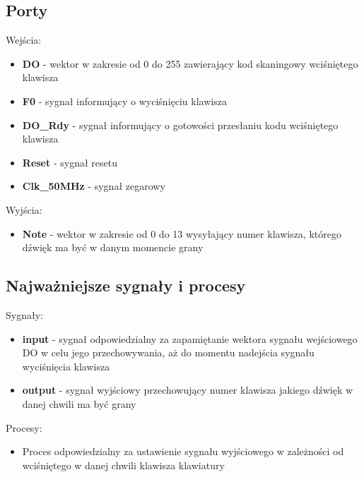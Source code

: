 \documentclass[a4paper]{report}
\begin{document}
		\subsection{Porty}
			{\Large Wejścia:}
			\begin{itemize}	 
				\item \textbf{DO} - wektor w zakresie od 0 do 255 zawierający kod skaningowy wciśniętego klawisza
				\item \textbf{F0} - sygnał informujący o wyciśnięciu klawisza
				\item \textbf{DO\_Rdy} - sygnał informujący o gotowości przesłaniu kodu wciśniętego klawisza
				\item \textbf{Reset} - sygnał resetu
				\item \textbf{Clk\_50MHz} - sygnał zegarowy
			\end{itemize}
			{\Large Wyjścia:}
			\begin{itemize} 
				\item \textbf{Note} - wektor w zakresie od 0 do 13 wysyłający numer klawisza, którego dźwięk ma być w danym momencie grany
			\end{itemize}
		\subsection{Najważniejsze sygnały i procesy}
			{\Large Sygnały:}
			\begin{itemize}
				\item \textbf{input} - sygnał odpowiedzialny za zapamiętanie wektora sygnału wejściowego DO 
				w celu jego przechowywania, aż do momentu nadejścia sygnału wyciśnięcia klawisza
				\item \textbf{output} - sygnał wyjściowy przechowujący numer klawisza jakiego dźwięk w danej chwili ma być grany
			\end{itemize}
			{\Large Procesy:}
			\begin{itemize}
			\item Proces odpowiedzialny za ustawienie sygnału wyjściowego w zależności od wciśniętego w danej chwili klawisza klawiatury\\
				
			\end{itemize}
			
\end{document}
